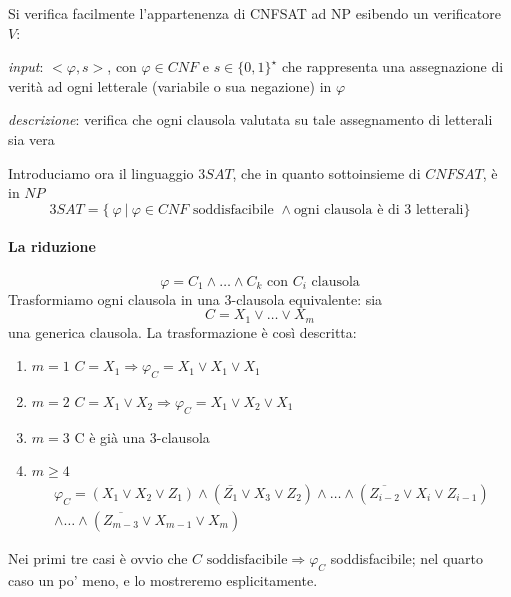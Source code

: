 Si verifica facilmente l'appartenenza di CNFSAT ad NP esibendo un verificatore $V$:
\begin{description}
    \item \textit{input}: $<\varphi, s>$, con $\varphi \in CNF$ e $s \in \{0, 1\}^{\star}$ che rappresenta una assegnazione di verità ad ogni letterale (variabile o sua negazione) in $\varphi$

    \item \textit{descrizione}: verifica che ogni clausola valutata su tale assegnamento di letterali sia vera
\end{description}

Introduciamo ora il linguaggio $3SAT$, che in quanto sottoinsieme di $CNFSAT$, è in $NP$
\[
    3SAT = \{ \ \varphi \ | \ \varphi \in CNF  \text{ soddisfacibile } \land \text{ogni clausola è di 3 letterali} \}
\]

\paragraph{La riduzione}

\[
	\varphi = C_1 \land \dots \land C_k \text{ con } C_i \text{ clausola}
\]
Trasformiamo ogni clausola in una 3-clausola equivalente: sia 
\[
	C = X_1 \lor \dots \lor X_m
\] 
una generica clausola. La trasformazione è così descritta:

\begin{enumerate}
    \item $m=1$ \quad $C = X_1 \Rightarrow \varphi_C = X_1 \lor X_1 \lor X_1$
    \item $m=2$ \quad $C = X_1 \lor X_2 \Rightarrow \varphi_C = X_1 \lor X_2 \lor X_1$
    \item $m=3$ \quad C è già una 3-clausola
    \item $m\geq 4$
\begin{gather*}
	\varphi_C = \left( X_1 \lor X_2 \lor Z_1 \right) \land
		\left( \overline{Z_1} \lor X_3 \lor Z_2 \right) \land \dots \land
        \left( \overline{Z_{i-2}} \lor X_i \lor Z_{i-1} \right) \\
        \land \dots \land \left( \overline{Z_{m-3}} \lor X_{m-1} \lor X_{m} \right)
\end{gather*}
\end{enumerate}

Nei primi tre casi è ovvio che $C \text{ soddisfacibile} \Rightarrow \varphi_C$ soddisfacibile; nel quarto caso un po' meno, e lo mostreremo esplicitamente.

